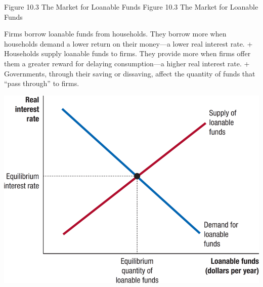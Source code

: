\documentclass[
  12pt,
  ignorenonframetext,
]{beamer}
\begin{document}
\begin{frame}{Figure 10.3 The Market for Loanable Funds}
\label{figure-10.3-the-market-for-loanable-funds}
Figure 10.3 The Market for Loanable Funds

Firms borrow loanable funds from households. They borrow more when
households demand a lower return on their money---a lower real interest
rate. + Households supply loanable funds to firms. They provide more
when firms offer them a greater reward for delaying consumption---a
higher real interest rate. + Governments, through their saving or
dissaving, affect the quantity of funds that ``pass through'' to firms.

\includegraphics[width=\textwidth,height=0.99\textheight]{imgs3/img_slide26a.png}
\end{frame}
\end{document}

